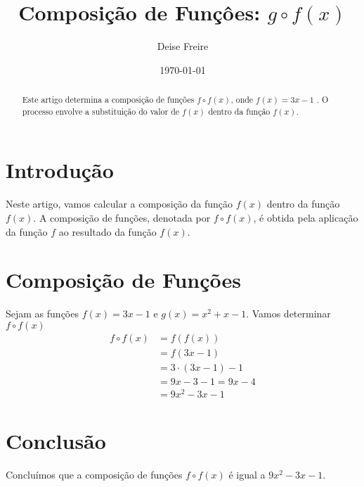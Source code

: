 \documentclass[12pt,a4paper]{article}
\begin{document}
\title{Composição de Funçôes: $g \circ f\left( x \right)$}
\author{Deise Freire}
\date{\today}
\maketitle
\begin{abstract}
    Este artigo determina a composição de funções $f \circ f\left( x \right)$, onde $f\left( x \right) = 3x - 1$ . O processo envolve a substituição do valor de $f\left(x \right)$ dentro da função $f\left( x \right)$.
\end{abstract}
\section{Introdução}
Neste artigo, vamos calcular a composição da função $f\left( x \right)$ dentro da função $f\left( x \right)$. A composição de funções, denotada por $f \circ f\left( x \right)$, é obtida pela aplicação da função $f$ ao resultado da função $f\left( x \right)$.
\section{Composição de Funções}
Sejam as funções $f\left( x \right) = 3x - 1$ e $g\left( x \right) = x^{2} + x - 1$. Vamos determinar $f \circ f\left( x \right)$
\begin{align*}
    f \circ f\left( x \right) 
    &= f\left( f\left( x \right) \right) \\
    &= f\left( 3x - 1 \right) \\
    &= 3 \cdot \left( 3x - 1 \right) - 1 \\
    &= 9x - 3 - 1 = 9x - 4 \\
    &= \boxed{9x^{2} - 3x - 1} 
\end{align*}
\section{Conclusão}
Concluímos que a composição de funções $f \circ f\left( x \right)$ é igual a $9x^{2} - 3x - 1$.
\end{document}
